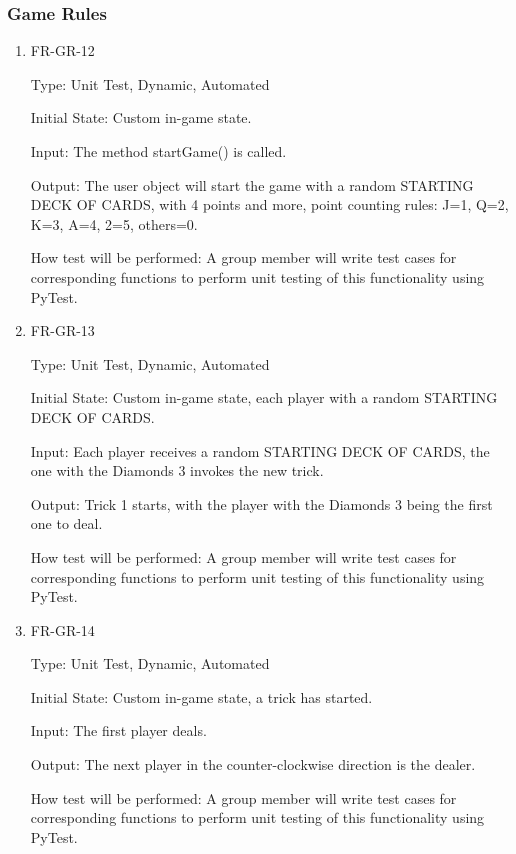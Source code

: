\documentclass[12pt, titlepage]{article}
\begin{document}
\subsubsection{Game Rules}

\begin{enumerate}

\item{FR-GR-12\\}

Type: Unit Test, Dynamic, Automated
					
Initial State: Custom in-game state.
					
Input: The method startGame() is called.
					
Output: The user object will start the game with a random STARTING DECK OF CARDS, with 4 points and more, point counting rules:  J=1, Q=2, K=3, A=4, 2=5, others=0.
					
How test will be performed: A group member will write test cases for corresponding functions to perform unit testing of this functionality using PyTest.

\item{FR-GR-13\\}

Type: Unit Test, Dynamic, Automated
					
Initial State: Custom in-game state, each player with a random STARTING DECK OF CARDS.
					
Input: Each player receives a random STARTING DECK OF CARDS, the one with the Diamonds 3 invokes the new trick.
					
Output: Trick 1 starts, with the player with the Diamonds 3 being the first one to deal.
					
How test will be performed: A group member will write test cases for corresponding functions to perform unit testing of this functionality using PyTest.

\item{FR-GR-14\\}

Type: Unit Test, Dynamic, Automated
					
Initial State: Custom in-game state, a trick has started.
					
Input: The first player deals.
					
Output: The next player in the counter-clockwise direction is the dealer.
					
How test will be performed: A group member will write test cases for corresponding functions to perform unit testing of this functionality using PyTest.


\end{enumerate}
\end{document}
